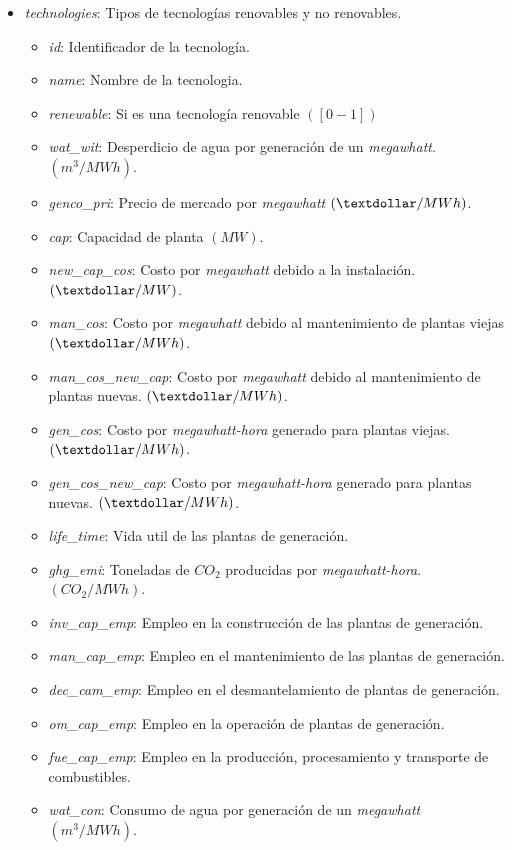 \begin{itemize}
	\item \textit{technologies}: Tipos de tecnologías renovables y no renovables.
	\begin{itemize}
		\item \textit{id}: Identificador de la tecnología.		
		\item \textit{name}: Nombre de la tecnologia.
		\item \textit{renewable}: Si es una tecnología renovable $ ([0 - 1]) $
		\item \textit{wat\_wit}: Desperdicio de agua por generación de un \textit{megawhatt}. $ (m^{3}/MWh) $.
		\item \textit{genco\_pri}: Precio de mercado por \textit{megawhatt} $ (\textdollar/MWh) $.
		\item \textit{cap}: Capacidad de planta $ (MW) $.
		\item \textit{new\_cap\_cos}: Costo por \textit{megawhatt} debido a la instalación. $ (\textdollar/MW) $.
		\item \textit{man\_cos}: Costo por \textit{megawhatt} debido al mantenimiento de plantas viejas $ (\textdollar/MWh) $.
		\item \textit{man\_cos\_new\_cap}: Costo por \textit{megawhatt} debido al mantenimiento de plantas nuevas. $ (\textdollar/MWh) $.
		\item \textit{gen\_cos}: Costo por \textit{megawhatt-hora} generado para plantas viejas. $ (\textdollar/MWh) $.
		\item \textit{gen\_cos\_new\_cap}: Costo por \textit{megawhatt-hora} generado para plantas nuevas. $ (\textdollar/MWh) $.
		\item \textit{life\_time}: Vida util de las plantas de generación.
		\item \textit{ghg\_emi}: Toneladas de $CO_{2}$ producidas por \textit{megawhatt-hora}. $(CO_{2}/MWh)$.
		\item \textit{inv\_cap\_emp}: Empleo en la construcción de las plantas de generación.
		\item \textit{man\_cap\_emp}: Empleo en el mantenimiento de las plantas de generación.
		\item \textit{dec\_cam\_emp}: Empleo en el desmantelamiento de plantas de generación.
		\item \textit{om\_cap\_emp}: Empleo en la operación de plantas de generación.
		\item \textit{fue\_cap\_emp}: Empleo en la producción, procesamiento y transporte de combustibles.
		\item \textit{wat\_con}: Consumo de agua por generación de un \textit{megawhatt} $ (m^{3}/MWh) $.
	\end{itemize}


\end{itemize}
